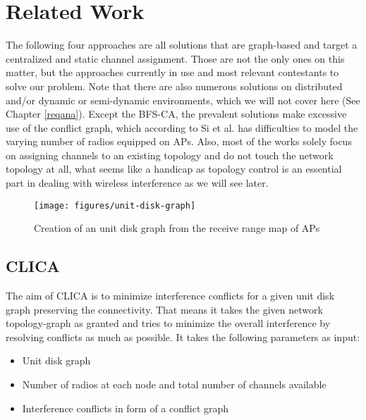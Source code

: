 \chapter{Related Work}
  The following four approaches are all solutions that are graph-based and target a centralized and static channel assignment.
  Those are not the only ones on this matter, but the approaches currently in use and most relevant contestants to solve our problem.
  Note that there are also numerous solutions on distributed and/or dynamic or semi-dynamic environments, which we will not cover here (See Chapter \ref{reqana}).
  Except the \ac{BFS-CA}, the prevalent solutions make excessive use of the conflict graph, which according to Si et al. \cite{overview_caa} has difficulties to model 
  the varying number of radios equipped on APs. 
  Also, most of the works solely focus on assigning channels to an existing topology and do not touch the network topology at all,
  what seems like a handicap as topology control is an essential part in dealing with wireless interference as we will see later.
  
  \begin{figure}[h!]
    \centering
    \texttt{[image: figures/unit-disk-graph]}
    \caption{Creation of an unit disk graph from the receive range map of APs}
    \label{fig:unit-disk-graph}
  \end{figure}
  
  \section{\ac{CLICA}}
    The aim of \ac{CLICA} \cite{CLICA} is to minimize interference conflicts for a given unit disk graph preserving the connectivity.
    That means it takes the given network topology-graph as granted and tries to minimize the overall interference by resolving conflicts as much as possible.
    It takes the following parameters as input:
    
    \begin{itemize}
      \item Unit disk graph
      
      \item Number of radios at each node and total number of channels available
      
      \item Interference conflicts in form of a conflict graph
    \end{itemize}
    
